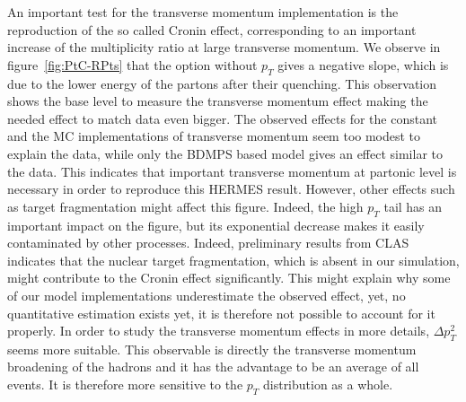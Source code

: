 An important test for the transverse momentum implementation is the 
reproduction of the so called Cronin effect, corresponding to an important 
increase of the multiplicity ratio at large transverse momentum. We observe in 
figure~\ref{fig:PtC-RPts} that the option without $p_T$ gives a negative slope, 
which is due to the lower energy of the partons after their quenching. This 
observation shows the base level to measure the transverse momentum effect 
making the needed effect to match data even bigger. The observed effects for 
the constant and the MC implementations of transverse momentum seem too modest 
to explain the data, while only the BDMPS based model gives an effect similar 
to the data. This indicates that important transverse momentum at partonic 
level is necessary in order to reproduce this HERMES result. However, other 
effects such as target fragmentation might affect this figure. Indeed, the high 
$p_T$ tail has an important impact on the figure, but its exponential decrease 
makes it easily contaminated by other processes. Indeed, preliminary results 
from CLAS \cite{dupre-th} indicates that the nuclear target fragmentation, 
which is absent in our simulation, might contribute to the Cronin effect 
significantly. This might explain why some of our model implementations 
underestimate the observed effect, yet, no quantitative estimation exists yet, 
it is therefore not possible to account for it properly. In order to study the 
transverse momentum effects in more details, $\Delta p_T^2$ seems more 
suitable. This observable is directly the transverse momentum broadening of the 
hadrons and it has the advantage to be an average of all events. It is 
therefore more sensitive to the $p_T$ distribution as a whole.

